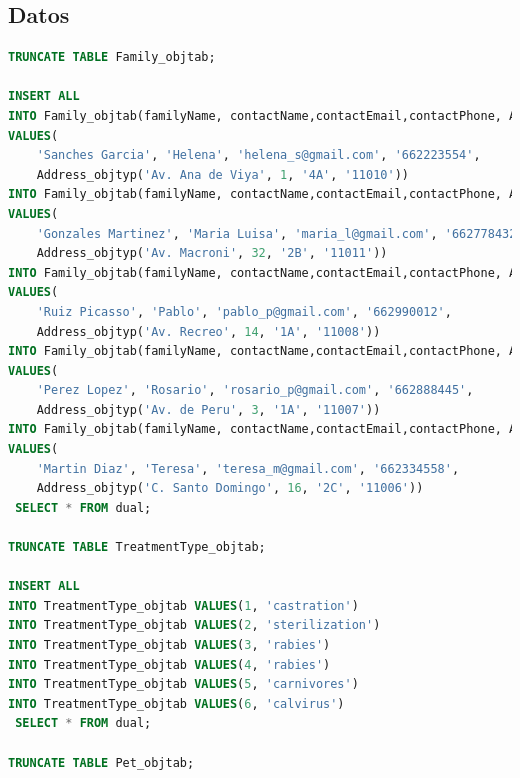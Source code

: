 \documentclass{FR16}
\begin{document}
\subsection{Datos}
\begin{lstlisting}[language=Sql, basicstyle=\scriptsize]
TRUNCATE TABLE Family_objtab;

INSERT ALL
INTO Family_objtab(familyName, contactName,contactEmail,contactPhone, Address_obj)
VALUES(
    'Sanches Garcia', 'Helena', 'helena_s@gmail.com', '662223554',
    Address_objtyp('Av. Ana de Viya', 1, '4A', '11010'))
INTO Family_objtab(familyName, contactName,contactEmail,contactPhone, Address_obj)
VALUES(
    'Gonzales Martinez', 'Maria Luisa', 'maria_l@gmail.com', '662778432',
    Address_objtyp('Av. Macroni', 32, '2B', '11011'))
INTO Family_objtab(familyName, contactName,contactEmail,contactPhone, Address_obj)
VALUES(
    'Ruiz Picasso', 'Pablo', 'pablo_p@gmail.com', '662990012',
    Address_objtyp('Av. Recreo', 14, '1A', '11008'))
INTO Family_objtab(familyName, contactName,contactEmail,contactPhone, Address_obj)
VALUES(
    'Perez Lopez', 'Rosario', 'rosario_p@gmail.com', '662888445',
    Address_objtyp('Av. de Peru', 3, '1A', '11007'))
INTO Family_objtab(familyName, contactName,contactEmail,contactPhone, Address_obj)
VALUES(
    'Martin Diaz', 'Teresa', 'teresa_m@gmail.com', '662334558',
    Address_objtyp('C. Santo Domingo', 16, '2С', '11006'))
 SELECT * FROM dual;

TRUNCATE TABLE TreatmentType_objtab;

INSERT ALL
INTO TreatmentType_objtab VALUES(1, 'castration')
INTO TreatmentType_objtab VALUES(2, 'sterilization')
INTO TreatmentType_objtab VALUES(3, 'rabies')
INTO TreatmentType_objtab VALUES(4, 'rabies')
INTO TreatmentType_objtab VALUES(5, 'carnivores')
INTO TreatmentType_objtab VALUES(6, 'calvirus')
 SELECT * FROM dual;

TRUNCATE TABLE Pet_objtab;


\end{lstlisting}
\end{document}
